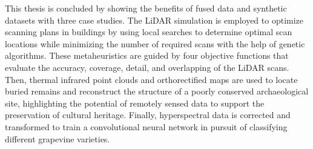 This thesis is concluded by showing the benefits of fused data and synthetic datasets with three case studies. The LiDAR simulation is employed to optimize scanning plans in buildings by using local searches to determine optimal scan locations while minimizing the number of required scans with the help of genetic algorithms. These metaheuristics are guided by four objective functions that evaluate the accuracy, coverage, detail, and overlapping of the LiDAR scans. Then, thermal infrared point clouds and orthorectified maps are used to locate buried remains and reconstruct the structure of a poorly conserved archaeological site, highlighting the potential of remotely sensed data to support the preservation of cultural heritage. Finally, hyperspectral data is corrected and transformed to train a convolutional neural network in pursuit of classifying different grapevine varieties.


